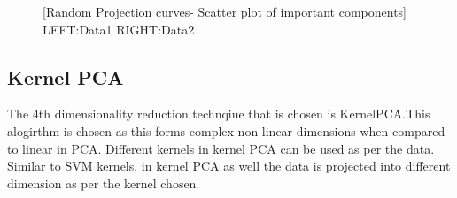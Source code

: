 \documentclass[12pt]{article}
\begin{document}
\begin{figure}[htbp]
    \centering
    \caption{[Random Projection curves- Scatter plot of important components] LEFT:Data1 RIGHT:Data2 }
    \label{fig:foobar}
\end{figure}

\subsection{Kernel PCA}
The 4th dimensionality reduction technqiue that is chosen is KernelPCA.This alogirthm is chosen as this forms complex non-linear dimensions when compared to linear in PCA. Different kernels in kernel PCA can be used as per the data. Similar to SVM kernels, in kernel PCA as well the data is projected into different dimension as per the kernel chosen.
\end{document}
